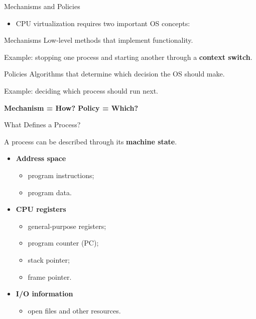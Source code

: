 \begin{frame}{Mechanisms and Policies}

\begin{itemize}
    \item CPU virtualization requires two important OS concepts:
\end{itemize}

\begin{block}{Mechanisms}
Low-level methods that implement functionality.

\medskip

Example: stopping one process and starting another through a
\textbf{context switch}.
\end{block}

\begin{block}{Policies}
Algorithms that determine which decision the OS should make.

\medskip

Example: deciding which process should run next.
\end{block}

\begin{center}
\textbf{Mechanism = How? \qquad Policy = Which?}
\end{center}

\end{frame}

\begin{frame}{What Defines a Process?}

A process can be described through its \textbf{machine state}.

\begin{itemize}
    \item \textbf{Address space}
    \begin{itemize}
        \item program instructions;
        \item program data.
    \end{itemize}

    \item \textbf{CPU registers}
    \begin{itemize}
        \item general-purpose registers;
        \item program counter (PC);
        \item stack pointer;
        \item frame pointer.
    \end{itemize}

    \item \textbf{I/O information}
    \begin{itemize}
        \item open files and other resources.
    \end{itemize}
\end{itemize}

\end{frame}

